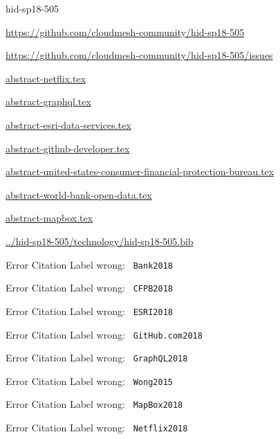 \begin{IU}

hid-sp18-505

\url{https://github.com/cloudmesh-community/hid-sp18-505}

\url{https://github.com/cloudmesh-community/hid-sp18-505/issues}

\href{https://github.com/cloudmesh-community/hid-sp18-505/blob/master//technology/abstract-netflix.tex}{abstract-netflix.tex}

\href{https://github.com/cloudmesh-community/hid-sp18-505/blob/master//technology/abstract-graphql.tex}{abstract-graphql.tex}

\href{https://github.com/cloudmesh-community/hid-sp18-505/blob/master//technology/abstract-esri-data-services.tex}{abstract-esri-data-services.tex}

\href{https://github.com/cloudmesh-community/hid-sp18-505/blob/master//technology/abstract-github-developer.tex}{abstract-github-developer.tex}

\href{https://github.com/cloudmesh-community/hid-sp18-505/blob/master//technology/abstract-united-states-consumer-financial-protection-bureau.tex}{abstract-united-states-consumer-financial-protection-bureau.tex}

\href{https://github.com/cloudmesh-community/hid-sp18-505/blob/master//technology/abstract-world-bank-open-data.tex}{abstract-world-bank-open-data.tex}

\href{https://github.com/cloudmesh-community/hid-sp18-505/blob/master//technology/abstract-mapbox.tex}{abstract-mapbox.tex}

\href{https://github.com/cloudmesh-community/hid-sp18-505/blob/master//technology/hid-sp18-505.bib}{../hid-sp18-505/technology/hid-sp18-505.bib}

 Error Citation Label wrong: \verb| Bank2018 |

 Error Citation Label wrong: \verb| CFPB2018 |

 Error Citation Label wrong: \verb| ESRI2018 |

 Error Citation Label wrong: \verb| GitHub.com2018 |

 Error Citation Label wrong: \verb| GraphQL2018 |

 Error Citation Label wrong: \verb| Wong2015 |

 Error Citation Label wrong: \verb| MapBox2018 |

 Error Citation Label wrong: \verb| Netflix2018 |

\end{IU}


